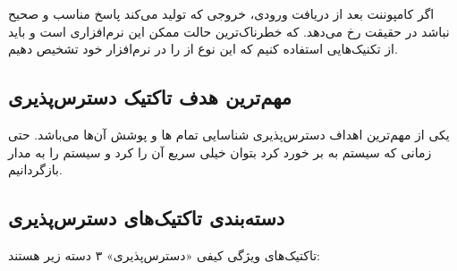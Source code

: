 اگر کامپوننت بعد از دریافت ورودی، خروجی که تولید می‌کند پاسخ مناسب و صحیح نباشد
در حقیقت  رخ می‌دهد. که خطرناک‌ترین حالت ممکن این 
نرم‌افزاری است و باید از تکنیک‌هایی استفاده کنیم که این نوع از  را در
نرم‌افزار خود تشخیص دهیم.

\subsection{مهم‌ترین هدف تاکتیک دسترس‌پذیری}

یکی از مهم‌ترین اهداف دسترس‌پذیری شناسایی تمام ها و پوشش آن‌ها
می‌باشد.  حتی زمانی که سیستم به  بر خورد کرد بتوان خیلی سریع آن را
 کرد و سیستم را به مدار بازگردانیم.

\subsection{دسته‌بندی تاکتیک‌های دسترس‌پذیری}

تاکتیک‌های ویژگی کیفی «دسترس‌پذیری» ۳ دسته زیر هستند:

\subsubsection{}

